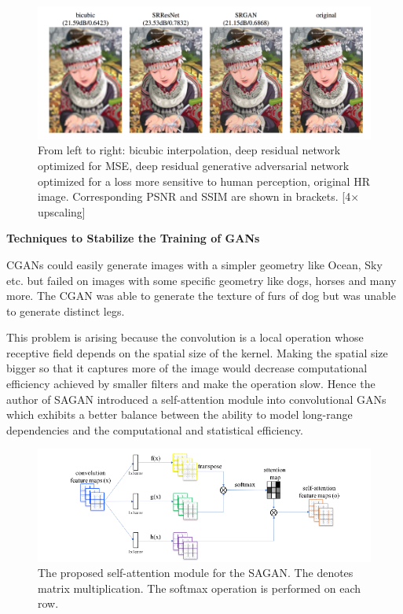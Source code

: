 \documentclass{article}
\begin{document}
\begin{figure}[h]
    \centering
    \includegraphics[width=1\textwidth]{images/special_srgan.png}
    \caption{From left to right: bicubic interpolation, deep residual network optimized for MSE, deep residual generative adversarial network optimized for a loss more sensitive to human perception, original HR image. Corresponding PSNR and SSIM are shown in brackets. [4× upscaling]}
    \label{fig:mesh1}
\end{figure}

\medskip
\begin{center}
    {\Large{\textbf{Techniques to Stabilize the Training of GANs}}}
\end{center}

CGANs could easily generate images with a simpler geometry like Ocean, Sky etc. but failed on images with some specific geometry like dogs, horses and many more. The CGAN was able to generate the texture of furs of dog but was unable to generate distinct legs.

This problem is arising because the convolution is a local operation whose receptive field depends on the spatial size of the kernel. Making the spatial size bigger so that it captures more of the image would decrease computational efficiency achieved by smaller filters and make the operation slow. Hence the author of SAGAN introduced a self-attention module into convolutional GANs which  exhibits a better balance between the ability to model long-range dependencies and the computational and statistical efficiency. 


\begin{figure}[h]
    \centering
    \includegraphics[width=.7\textwidth]{images/stablize_sa.png}
    \caption{The proposed self-attention module for the SAGAN. The \optimes denotes matrix multiplication. The softmax operation is performed on each row.}
    \label{fig:mesh1}
\end{figure}
\end{document}
